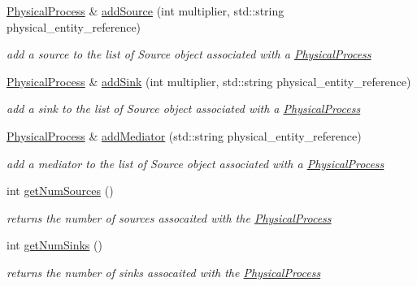 \begin{DoxyCompactItemize}
\hyperlink{classomexmeta_1_1PhysicalProcess}{Physical\+Process} \& \hyperlink{classomexmeta_1_1PhysicalProcess_ab83f58b7df77fdee131c22c71da22f39}{add\+Source} (int multiplier, std\+::string physical\+\_\+entity\+\_\+reference)
\begin{DoxyCompactList}\small\item\em add a source to the list of Source object associated with a \hyperlink{classomexmeta_1_1PhysicalProcess}{Physical\+Process} \end{DoxyCompactList}\item 
\hyperlink{classomexmeta_1_1PhysicalProcess}{Physical\+Process} \& \hyperlink{classomexmeta_1_1PhysicalProcess_a403ffc7d7d29702f2ff4e56084a1d714}{add\+Sink} (int multiplier, std\+::string physical\+\_\+entity\+\_\+reference)
\begin{DoxyCompactList}\small\item\em add a sink to the list of Source object associated with a \hyperlink{classomexmeta_1_1PhysicalProcess}{Physical\+Process} \end{DoxyCompactList}\item 
\hyperlink{classomexmeta_1_1PhysicalProcess}{Physical\+Process} \& \hyperlink{classomexmeta_1_1PhysicalProcess_a2bdf8dde5ffa6b38d5042db49fd211d1}{add\+Mediator} (std\+::string physical\+\_\+entity\+\_\+reference)
\begin{DoxyCompactList}\small\item\em add a mediator to the list of Source object associated with a \hyperlink{classomexmeta_1_1PhysicalProcess}{Physical\+Process} \end{DoxyCompactList}\item 
int \hyperlink{classomexmeta_1_1PhysicalProcess_a56459d9f0087a3f92b0aca5d148b65f5}{get\+Num\+Sources} ()
\begin{DoxyCompactList}\small\item\em returns the number of sources assocaited with the \hyperlink{classomexmeta_1_1PhysicalProcess}{Physical\+Process} \end{DoxyCompactList}\item 
int \hyperlink{classomexmeta_1_1PhysicalProcess_ac8b79af15d4d19042ee34abca25f679f}{get\+Num\+Sinks} ()
\begin{DoxyCompactList}\small\item\em returns the number of sinks assocaited with the \hyperlink{classomexmeta_1_1PhysicalProcess}{Physical\+Process} \end{DoxyCompactList}\item 

\end{DoxyCompactItemize}
